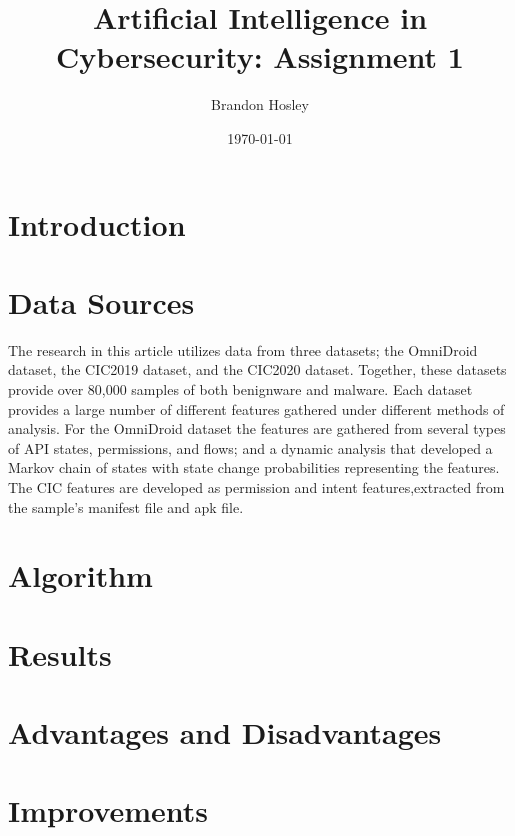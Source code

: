 \documentclass[]{article}
\title{Artificial Intelligence in Cybersecurity: Assignment 1}
\author{Brandon Hosley}
\date{\today}
\begin{document}
	\maketitle
	
\section{Introduction}

\section{Data Sources}

The research in this article utilizes data from three datasets; 
the OmniDroid \cite{Martin2019} dataset,  
the CIC2019 \cite{Taheri2019} dataset, and
the CIC2020 \cite{Rahali2020} dataset.
Together, these datasets provide over 80,000 samples of both benignware and malware.
Each dataset provides a large number of different features gathered under different methods of analysis.
For the OmniDroid dataset the features are gathered from several types of API states, permissions, and flows;
and a dynamic analysis that developed a Markov chain of states with state change probabilities representing the features.
The CIC features are developed as permission and intent features,extracted from the sample's manifest file and apk file.

\section{Algorithm}


\section{Results}


\section{Advantages and Disadvantages}


\section{Improvements}


\clearpage


\end{document}
